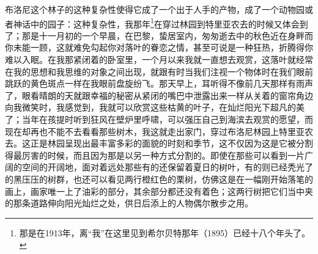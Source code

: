 \par 布洛尼这个林子的这种复杂性使得它成了一个出于人手的产物，成了一个动物园或者神话中的园子：这种复杂性，我那年\footnote{那是在1913年，离“我”在这里见到希尔贝特那年（1895）已经十八个年头了。}在穿过林园到特里亚农去的时候又体会到了；那是十一月初的一个早晨，在巴黎，蛰居室内，匆匆逝去中的秋色近在身畔而你未能一顾，这就难免勾起你对落叶的眷恋之情，甚至可说是一种狂热，折腾得你难以入眠。在我那紧闭着的卧室里，一个月以来我就一直想去观赏，这落叶就经常在我的思想和我思维的对象之间出现，就跟有时当我们注视一个物体时在我们眼前跳跃的黄色斑点一样在我眼前盘旋纷飞。那天早上，耳听得不像前几天那样有雨声了，眼看晴朗的天就跟幸福的秘密从紧闭的嘴巴中泄露出来一样从关着的窗帘角边向我微笑时，我感觉到，我就可以欣赏这些枯黄的叶子，在灿烂阳光下超凡的美了；当年在孩提时听到狂风在壁炉里呼啸，可以强压自己到海滨去观赏的愿望，而现在却再也不能不去看看那些树木，我这就走出家门，穿过布洛尼林园上特里亚农去。这正是林园呈现出最丰富多彩的面貌的时刻和季节，这不仅因为这是它被分割得最厉害的时候，而且因为那是以另一种方式分割的。即使在那些可以看到一片广阔的空间的开阔地，面对着远处那些有的还保留着夏日的树叶，有的则已经秃光了的黑压压的树群，也还可以看见两行橙红色的栗树，仿佛这是在一幅刚开始落笔的画上，画家唯一上了油彩的部分，其余部分都还没有着色；这两行树把它们当中夹的那条道路伸向阳光灿烂之处，供日后添上的人物偶尔散步之用。
